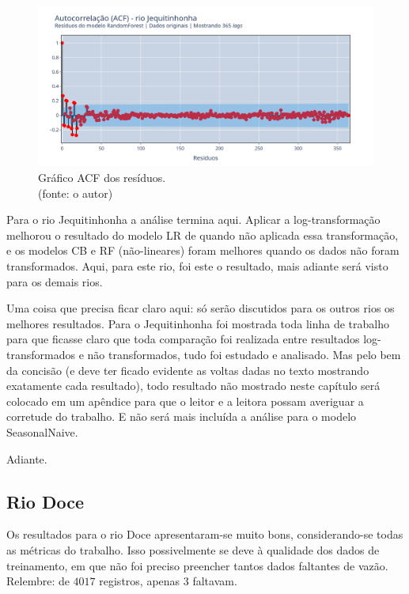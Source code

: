 \begin{figure}[!h]
	\centering
	\includegraphics[scale=0.33]{Figuras/jequiti/wfv/RF/RF_WFV_ORIG_RESID_ACF.png}
	\caption{Gráfico ACF dos resíduos.\\(fonte: o autor)}
	\label{fig:jequiti_RF_WFV_ORIG_RESID_ACF}
\end{figure}
\clearpage

Para o rio Jequitinhonha a análise termina aqui. Aplicar a log-transformação melhorou o resultado do modelo LR de quando não aplicada essa transformação, e os modelos CB e RF (não-lineares) foram melhores quando os dados não foram transformados. Aqui, para este rio, foi este o resultado, mais adiante será visto para os demais rios.

Uma coisa que precisa ficar claro aqui: só serão discutidos para os outros rios os melhores resultados. Para o Jequitinhonha foi mostrada toda linha de trabalho para que ficasse claro que toda comparação foi realizada entre resultados log-transformados e não transformados, tudo foi estudado e analisado. Mas pelo bem da concisão (e deve ter ficado evidente as voltas dadas no texto mostrando exatamente cada resultado), todo resultado não mostrado neste capítulo será colocado em um apêndice para que o leitor e a leitora possam averiguar a corretude do trabalho. E não será mais incluída a análise para o modelo SeasonalNaive.

Adiante.

\subsection{Rio Doce}

Os resultados para o rio Doce apresentaram-se muito bons, considerando-se todas as métricas do trabalho. Isso possivelmente se deve à qualidade dos dados de treinamento, em que não foi preciso preencher tantos dados faltantes de vazão. Relembre: de $4017$ registros, apenas $3$ faltavam.


